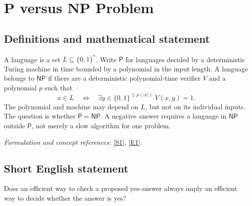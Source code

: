 \documentclass[11pt]{article}
\newcommand{\sref}[2]{\hyperlink{source:#1:#2}{[S#2]}}
\newcommand{\eref}[2]{\hyperlink{extra:#1:#2}{[E#2]}}
\newif\ifshowcatalogue
\newcommand{\cataloguescope}[1]{\ifshowcatalogue
 \paragraph{Exact scope in the supplied catalogue.}
 \begin{quote}\small #1\end{quote}\fi}
\begin{document}
\clearpage
\section*{\texorpdfstring{P versus NP Problem}{P versus NP Problem}}\label{statement}
\subsection{Definitions and mathematical statement}
A language is a set $L\subseteq\{0,1\}^*$. Write $\mathsf P$ for languages decided by a deterministic Turing machine in time bounded by a polynomial in the input length. A language belongs to $\mathsf{NP}$ if there are a deterministic polynomial-time verifier $V$ and a polynomial $p$ such that
\[
 x\in L\quad\Longleftrightarrow\quad \exists y\in\{0,1\}^{\le p(|x|)}\;V(x,y)=1.
\]
The polynomial and machine may depend on $L$, but not on its individual inputs. The question is whether $\mathsf P=\mathsf{NP}$. A negative answer requires a language in $\mathsf{NP}$ outside $\mathsf P$, not merely a slow algorithm for one problem.
\par\smallskip\textit{Formulation and concept references:} \sref{statement}{1}, \eref{statement}{1}.
\cataloguescope{Determine whether P = NP, that is, whether every decision problem whose solutions can be verified in polynomial time by a deterministic Turing machine can also be solved in polynomial time by a deterministic Turing machine.}
\subsection{Short English statement}
Does an efficient way to check a proposed yes-answer always imply an efficient way to decide whether the answer is yes?
\end{document}
